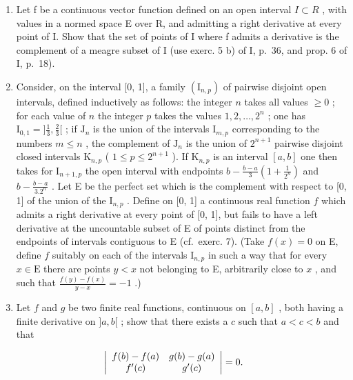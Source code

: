 \begin{enumerate}
\def\labelenumi{\arabic{enumi})}
\setcounter{enumi}{6}
\item
  Let f be a continuous vector function defined on an open interval \(I \subset R\) , with values in a normed space E over R, and admitting a right derivative at every point of I. Show that the set of points of I where f admits a derivative is the complement of a meagre subset of I (use exerc. 5 b) of I, p.~36, and prop. 6 of I, p.~18).
\item
  Consider, on the interval {[}0, 1{]}, a family \((\mathrm{I}_{n,p})\) of pairwise disjoint open intervals, defined inductively as follows: the integer \(n\) takes all values \(\geqslant 0\) ; for each value of \(n\) the integer \(p\) takes the values \(1,2,\ldots ,2^n\) ; one has \(\mathrm{I}_{0,1} = ]\frac{1}{3},\frac{2}{3}[\) ; if \(\mathrm{J}_n\) is the union of the intervals \(\mathrm{I}_{m,p}\) corresponding to the numbers \(m\leqslant n\) , the complement of \(\mathrm{J}_n\) is the union of \(2^{n + 1}\) pairwise disjoint closed intervals \(\mathrm{K}_{n,p}\) ( \(1\leqslant p\leqslant 2^{n + 1}\) ). If \(\mathrm{K}_{n,p}\) is an interval \([a,b]\) one then takes for \(\mathrm{I}_{n + 1,p}\) the open interval with endpoints \(b - \frac{b - a}{3}\left(1 + \frac{1}{2^n}\right)\) and \(b - \frac{b - a}{3.2^n}\) . Let E be the perfect set which is the complement with respect to {[}0, 1{]} of the union of the \(\mathrm{I}_{n,p}\) . Define on {[}0, 1{]} a continuous real function \(f\) which admits a right derivative at every point of {[}0, 1{]}, but fails to have a left derivative at the uncountable subset of E of points distinct from the endpoints of intervals contiguous to E (cf.~exerc. 7). (Take \(f(x) = 0\) on E, define \(f\) suitably on each of the intervals \(\mathrm{I}_{n,p}\) in such a way that for every \(x\in \mathrm{E}\) there are points \(y < x\) not belonging to E, arbitrarily close to \(x\) , and such that \(\frac{f(y) - f(x)}{y - x} = -1\) .)
\item
  Let \(f\) and \(g\) be two finite real functions, continuous on \([a, b]\) , both having a finite derivative on \(]a, b[\) ; show that there exists a \(c\) such that \(a < c < b\) and that
\end{enumerate}

\[
\left| \begin{array}{c c} f (b) - f (a) & g (b) - g (a) \\ f ^ {\prime} (c) & g ^ {\prime} (c) \end{array} \right| = 0.
\]

